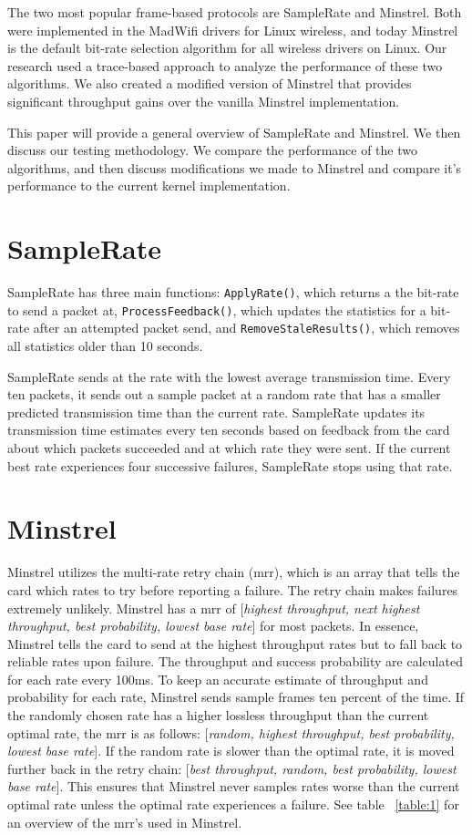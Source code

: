\documentclass[letterpaper,twocolumn,10pt]{article}
\begin{document}
The two most popular frame-based protocols are SampleRate and Minstrel. Both were implemented in the MadWifi drivers for Linux wireless, and today Minstrel is the default bit-rate selection algorithm for all wireless drivers on Linux. Our research used a trace-based approach to analyze the performance of these two algorithms. We also created a modified version of Minstrel that provides significant throughput gains over the vanilla Minstrel implementation. 

This paper will provide a general overview of SampleRate and Minstrel. We then discuss our testing methodology. We compare the performance of the two algorithms, and then discuss modifications we made to Minstrel and compare it's performance to the current kernel implementation.
\section{SampleRate}

SampleRate has three main functions: \texttt{ApplyRate()}, which returns a the bit-rate to send a packet at, \texttt{ProcessFeedback()}, which updates the statistics for a bit-rate after an attempted packet send,  and \texttt{RemoveStaleResults()}, which removes all statistics older than 10 seconds.

SampleRate sends at the rate with the lowest average transmission time. Every ten packets, it sends out a sample packet at a random rate that has a smaller predicted transmission time than the current rate. SampleRate updates its transmission time estimates every ten seconds based on feedback from the card about which packets succeeded and at which rate they were sent. If the current best rate experiences four successive failures, SampleRate stops using that rate. 

\section{Minstrel}

Minstrel utilizes the multi-rate retry chain (mrr), which is an array that tells the card which rates to try before reporting a failure. The retry chain makes failures extremely unlikely. Minstrel has a mrr of [\emph{highest throughput, next highest throughput, best probability, lowest base rate}] for most packets. In essence, Minstrel tells the card to send at the highest throughput rates but to fall back to reliable rates upon failure. The throughput and success probability are calculated for each rate every 100ms. 
To keep an accurate estimate of throughput and probability for each rate, Minstrel sends sample frames ten percent of the time. If the randomly chosen rate has a higher lossless throughput than the current optimal rate, the mrr is as follows: [\emph{random, highest throughput, best probability, lowest base rate}]. If the random rate is slower than the optimal rate, it is moved further back in the retry chain: [\emph{best throughput, random, best probability, lowest base rate}]. This ensures that Minstrel never samples rates worse than the current optimal rate unless the optimal rate experiences a failure. See table ~\ref{table:1} for an overview of the mrr's used in Minstrel.
\end{document}
